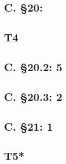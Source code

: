 \documentclass{article}
\begin{document}
\subsection{C. \S20:}
\subsection{T4}
\subsection{C. \S20.2: 5}
\subsection{C. \S20.3: 2}
\subsection{C. \S21: 1}
\subsection{T5*}
\end{document}
